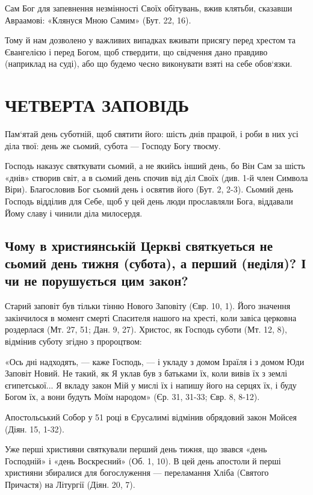 \documentclass[main.tex]{subfiles}
\begin{document}
Сам Бог для запевнення незмінності Своїх обітувань, вжив клятьби, сказавши Авраамові: «Клянуся Мною Самим» (Бут. 22, 16).

Тому й нам дозволено у важливих випадках вживати присягу перед хрестом та Євангелією і перед Богом, щоб ствердити, що свідчення дано правдиво (наприклад на суді), або що будемо чесно виконувати взяті на себе обов`язки.

\section{ЧЕТВЕРТА ЗАПОВІДЬ}

Пам`ятай день суботній, щоб святити його: шість днів працюй, і роби в них усі діла твої: день же сьомий, субота — Господу Богу твоєму.

Господь наказує святкувати сьомий, а не якийсь інший день, бо Він Сам за шість «днів» створив світ, а в сьомий день спочив від діл Своїх (див. 1-й член Символа Віри). Благословив Бог сьомий день і освятив його (Бут. 2, 2-3). Сьомий день Господь відділив для Себе, щоб у цей день люди прославляли Бога, віддавали Йому славу і чинили діла милосердя.

\subsection{Чому в християнській Церкві святкуеться не сьомий день тижня (субота), а перший (неділя)? І чи не порушується цим закон?}

Старий заповіт був тільки тінню Нового Заповіту (Євр. 10, 1). Його значення закінчилося в момент смерті Спасителя нашого на хресті, коли завіса церковна роздерлася (Мт. 27, 51; Дан. 9, 27). Христос, як Господь суботи (Мт. 12, 8), відмінив суботу згідно з пророцтвом:

«Ось дні надходять, — каже Господь, — і укладу з домом Ізраїля і з домом Юди Заповіт Новий. Не такий, як Я уклав був з батьками їх, коли вивів їх з землі єгипетської... Я вкладу закон Мій у мислі їх і напишу його на серцях їх, і буду Богом їх, а вони будуть Моїм народом» (Єр. 31, 31-33; Євр. 8, 8-12).

Апостольський Собор у 51 році в Єрусалимі відмінив обрядовий закон Мойсея (Діян. 15, 1-32).

Уже перші християни святкували перший день тижня, що звався «день Господній» і «день Воскресний» (Об. 1, 10). В цей день апостоли й перші християни збиралися для богослуження — переламання Хліба (Святого Причастя) на Літургії (Діян. 20, 7).
 
\end{document}
